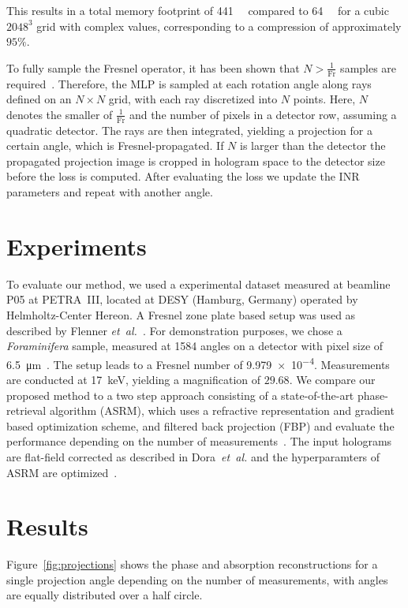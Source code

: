 \documentclass{article}
\begin{document}
This results in a total memory footprint of \qty{441}{\mega\byte} compared to \qty{64}{\gibi\byte} for a cubic $2048^3$ grid with complex values, corresponding to a compression of approximately $95\%$.  

To fully sample the Fresnel operator, it has been shown that $N > \frac{1}{\mathrm{Fr}}$ samples are required~\cite{paganinCoherentXrayOptics2006a}.  
Therefore, the MLP is sampled at each rotation angle along rays defined on an \( N \times N \) grid, with each ray discretized into \( N \) points. 
Here, \( N \) denotes the smaller of \( \frac{1}{\mathrm{Fr}} \) and the number of pixels in a detector row, assuming a quadratic detector.
The rays are then integrated, yielding a projection for a certain angle, which is Fresnel-propagated.
If $N$ is larger than the detector the propagated projection image is cropped in hologram space to the detector size before the loss is computed.
After evaluating the loss we update the INR parameters and repeat with another angle.
\section{Experiments}
To evaluate our method, we used a experimental dataset measured at beamline P05 at PETRA~III, located at DESY (Hamburg, Germany) operated by Helmholtz-Center Hereon.
A Fresnel zone plate based setup was used as described by Flenner \textit{et~al.}~\cite{flennerHardXrayNanoholotomography2020b}.
For demonstration purposes, we chose a \textit{Foraminifera} sample, measured at 1584 angles on a detector with pixel size of \qty{6.5}{\micro\meter}~\cite{niEarlyDiagenesisForaminiferal2020}.
The setup leads to a Fresnel number of \num{9.979e-4}.
Measurements are conducted at \qty{17}{\keV}, yielding a magnification of $29.68$.
We compare our proposed method to a two step approach consisting of a state-of-the-art phase-retrieval algorithm (ASRM), which uses a refractive representation and gradient based optimization scheme, and filtered back projection (FBP) and evaluate the performance depending on the number of measurements~\cite{doraArtifactsuppressingReconstructionStrongly2024}.
The input holograms are flat-field corrected as described in Dora~\textit{et~al.} and the hyperparamters of ASRM are optimized~\cite{doraArtifactsuppressingReconstructionStrongly2024}.

\section{Results}
Figure~\ref{fig:projections} shows the phase and absorption reconstructions for a single projection angle depending on the number of measurements, with angles are equally distributed over a half circle.
\end{document}
